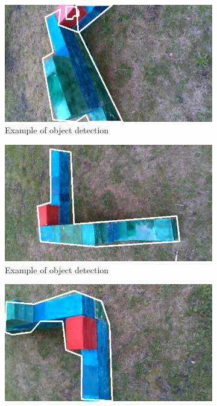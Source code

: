 \documentclass{ctuthesis}
\begin{document}
\begin{figure}[htbp]
     \centering
     \begin{subfigure}{0.475\textwidth}
         \centering
         \includegraphics[width=\textwidth]{NN_0.png}
         \caption{Example of object detection}
         \label{fig:y1}
     \end{subfigure}
     \hfill
     \begin{subfigure}{0.475\textwidth}
         \centering
         \includegraphics[width=\textwidth]{NN_1.png}
         \caption{Example of object detection}
         \label{fig:y2}
     \end{subfigure}
          \hfill
     \begin{subfigure}{0.475\textwidth}
         \centering
         \includegraphics[width=\textwidth]{NN_2.png}

\end{subfigure}
\end{figure}
\end{document}
